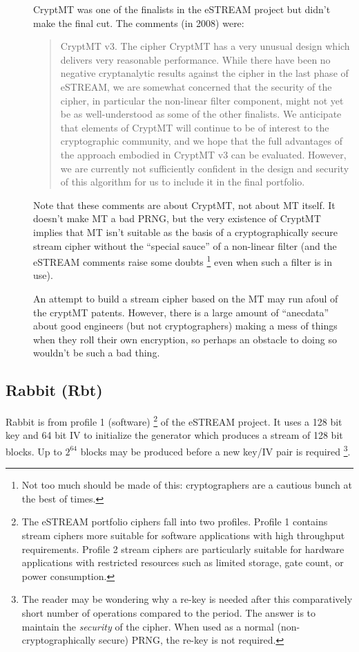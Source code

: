 \documentclass[letterpaper,12pt]{article}
\begin{document}
\begin{description}
\item[\PossiblyBadThing]
  CryptMT was one of the finalists in the eSTREAM project\cite{eStream} but
  didn't make the final cut.  The comments (in 2008) were:
  \begin{quote}
    {\sf
	CryptMT v3. The cipher CryptMT has a very unusual design which delivers
    very reasonable performance. While there have been no negative
    cryptanalytic results against the cipher in the last phase of eSTREAM,
    we are somewhat concerned that the security of the cipher, in
    particular the non-linear filter component, might not yet be as
    well-understood as some of the other finalists. We anticipate that
    elements of CryptMT will continue to be of interest to the
    cryptographic community, and we hope that the full advantages of the
    approach embodied in CryptMT v3 can be evaluated.  However, we are
    currently not sufficiently confident in the design and security of this
    algorithm for us to include it in the final portfolio.
    }
  \end{quote}
  Note that these comments are about CryptMT, not about MT itself.
  It doesn't make MT a bad PRNG, but the very existence of CryptMT implies
  that MT isn't suitable as the basis of a cryptographically secure stream
  cipher without the ``special sauce'' of a non-linear filter (and the
  eSTREAM comments raise some doubts%
  \footnote{
    Not too much should be made of this: cryptographers are a cautious
    bunch at the best of times.
    }
  even when such a filter is in use).

  An attempt to build a stream cipher based on the MT may run afoul of the
  cryptMT patents. However, there is a large amount of ``anecdata'' about
  good engineers (but not cryptographers) making a mess of things when they
  roll their own encryption, so perhaps an obstacle to doing so wouldn't be
  such a bad thing.
 
\end{description}
    
\subsection{Rabbit (Rbt)}
Rabbit is from profile 1 (software)%
\footnote{
  The eSTREAM portfolio ciphers fall into two profiles. Profile 1
  contains stream ciphers more suitable for software applications with high
  throughput requirements. Profile 2 stream ciphers are particularly
  suitable for hardware applications with restricted resources such as
  limited storage, gate count, or power consumption.
}
of the eSTREAM project\cite{eStream}. It uses a 128 bit key and 64 bit IV to
initialize the generator which produces a stream of 128 bit blocks. Up to
$2^{64}$ blocks may be produced before a new key/IV pair is required%
\footnote{
  The reader may be wondering why a re-key is needed after this
  comparatively short number of operations compared to the period. The
  answer is to maintain the {\em security} of the cipher. When used as a
  normal (non-cryptographically secure) PRNG, the re-key is not required.
}.
\end{document}
